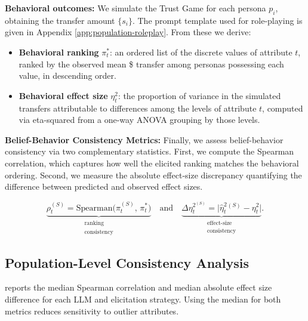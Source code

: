 \documentclass{article} %
\begin{document}
\noindent\textbf{Behavioral outcomes:}
We simulate the Trust Game for each persona \(p_i\), obtaining the transfer amount \(\{s_i\}\). The prompt template used for role-playing is given in Appendix \ref{app:population-roleplay}. From these we derive:
\begin{itemize}[leftmargin=*]
    \item \textbf{Behavioral ranking} $\pi^*_t$: an ordered list of the discrete values of attribute $t$, ranked by the observed mean \$ transfer among personas possessing each value, in descending order.
    \item \textbf{Behavioral effect size} $\eta^2_t$: the proportion of variance in the simulated transfers attributable to differences among the levels of attribute $t$, computed via eta-squared from a one-way ANOVA grouping by those levels.
\end{itemize}

\noindent\textbf{Belief-Behavior Consistency Metrics:} Finally, we assess belief-behavior consistency via two complementary statistics. First, we compute the Spearman correlation, which captures how well the elicited ranking matches the behavioral ordering. Second, we measure the absolute effect‐size discrepancy quantifying the difference between predicted and observed effect sizes.

\[
  \underbrace{\rho_t^{(S)} = \mathrm{Spearman}\bigl(\pi_t^{(S)},\,\pi^*_t\bigr)}_{\substack{\text{ranking}\\\text{consistency}}}
  \quad\text{and}\quad
  \underbrace{\Delta\eta_t^{2^{(S)}} = \bigl|\widehat\eta^2_t{}^{(S)} - \eta^2_t\bigr|}_{\substack{\text{effect‐size}\\\text{consistency}}}.
\]

\subsection{Population-Level Consistency Analysis}

 reports the median Spearman correlation and median absolute effect size difference for each LLM and elicitation strategy. Using the median for both metrics reduces sensitivity to outlier attributes.




\end{document}

